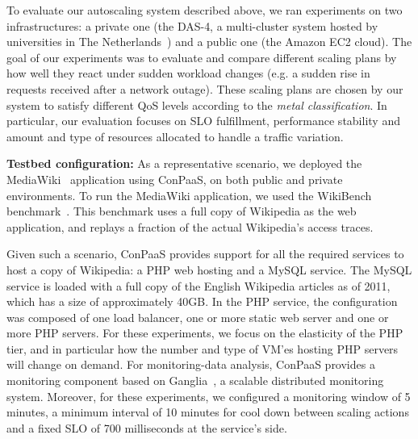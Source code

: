 
To evaluate our autoscaling system described above, we ran experiments
on two infrastructures: a private one (the DAS-4, a multi-cluster system
hosted by universities in The Netherlands~\cite{das4}) and a public
one (the Amazon EC2 cloud). The goal of our experiments
was to evaluate and compare different scaling plans by how well they react under sudden
workload changes (e.g. a sudden rise in requests received after a network outage). These scaling plans are chosen by our system to satisfy different QoS levels according to the \emph{metal classification}. In particular, our evaluation focuses on
SLO fulfillment, performance stability and amount and type of resources allocated to handle
a traffic variation. 



\textbf{Testbed configuration:}  As a representative scenario, we deployed the MediaWiki~\cite{mediawiki} application using ConPaaS, on both public and private environments. To run the MediaWiki application, we used the WikiBench benchmark~\cite{wikibench}. This benchmark uses a full copy of Wikipedia as the web application, and replays a fraction of the actual Wikipedia's access traces. 

Given such a scenario, ConPaaS provides support for all the required services to host a copy of Wikipedia: a PHP web hosting and a MySQL service. The MySQL service is loaded with a full copy of the English Wikipedia articles as of 2011, which has a size of approximately 40GB.  In the PHP service, the configuration was composed of one load balancer, one or more static web server and one or more PHP servers. For these experiments, we focus on the elasticity of the PHP tier, and in particular how the number and type of VM'es hosting PHP servers will change on demand. For monitoring-data analysis, ConPaaS provides a monitoring component based on Ganglia~\cite{ganglia}, a scalable distributed monitoring system. Moreover, for these experiments, we configured a monitoring window of 5 minutes, a minimum interval of 10 minutes for cool down between scaling actions and a fixed SLO of 700 milliseconds at the service's side.

